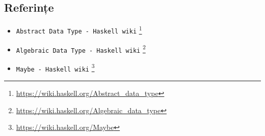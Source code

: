 \subsection*{ Referințe }

\begin{itemize}
	\item  \texttt{Abstract Data Type - Haskell wiki} \footnote{\url{https://wiki.haskell.org/Abstract\_data\_type}}
	\item  \texttt{Algebraic Data Type - Haskell wiki} \footnote{\url{https://wiki.haskell.org/Algebraic\_data\_type}}
	\item  \texttt{Maybe - Haskell wiki} \footnote{\url{https://wiki.haskell.org/Maybe}}
\end{itemize}
